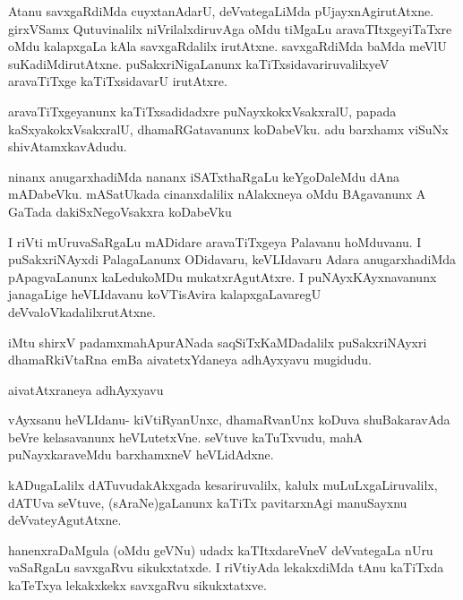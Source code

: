 \documentclass{article}
\begin{document}
\begin{mng}%
Atanu savxgaRdiMda cuyxtanAdarU, deVvategaLiMda pUjayxnAgirutAtxne. 
girxVSamx Qutuvinalilx niVrilalxdiruvAga oMdu tiMgaLu 
aravaTItxgeyiTaTxre oMdu kalapxgaLa kAla savxgaRdalilx irutAtxne. 
savxgaRdiMda baMda meVlU suKadiMdirutAtxne. puSakxriNigaLanunx 
kaTiTxsidavariruvalilxyeV aravaTiTxge kaTiTxsidavarU irutAtxre.
\end{mng}

\begin{mng}%
aravaTiTxgeyanunx kaTiTxsadidadxre puNayxkokxVsakxralU, papada 
kaSxyakokxVsakxralU, dhamaRGatavanunx koDabeVku. adu barxhamx viSuNx 
shivAtamxkavAdudu.
\end{mng}

\begin{mng}%
ninanx anugarxhadiMda nananx iSATxthaRgaLu keYgoDaleMdu dAna 
mADabeVku. mASatUkada cinanxdalilix nAlakxneya oMdu BAgavanunx A GaTada 
dakiSxNegoVsakxra  koDabeVku
\end{mng}

\begin{mng}%
I riVti mUruvaSaRgaLu mADidare aravaTiTxgeya Palavanu hoMduvanu. I 
puSakxriNAyxdi PalagaLanunx ODidavaru, keVLIdavaru Adara 
anugarxhadiMda pApagvaLanunx kaLedukoMDu mukatxrAgutAtxre. I 
puNAyxKAyxnavanunx janagaLige heVLIdavanu koVTisAvira kalapxgaLavaregU 
deVvaloVkadalilxrutAtxne.
\end{mng}

\begin{center}
iMtu shirxV padamxmahApurANada saqSiTxKaMDadalilx puSakxriNAyxri 
dhamaRkiVtaRna emBa aivatetxYdaneya adhAyxyavu mugidudu.
\end{center}

\begin{center}
{\textbf\large{aivatAtxraneya adhAyxyavu}}
\end{center}


\begin{mng}%
vAyxsanu heVLIdanu- kiVtiRyanUnxc, dhamaRvanUnx koDuva shuBakaravAda 
beVre kelasavanunx heVLutetxVne. seVtuve kaTuTxvudu, mahA 
puNayxkaraveMdu barxhamxneV heVLidAdxne.
\end{mng}

\begin{mng}%
kADugaLalilx dATuvudakAkxgada kesariruvalilx, kalulx 
muLuLxgaLiruvalilx, dATUva seVtuve, (sAraNe)gaLanunx kaTiTx 
pavitarxnAgi manuSayxnu deVvateyAgutAtxne.
\end{mng}

\begin{mng}%
hanenxraDaMgula (oMdu geVNu) udadx kaTItxdareVneV deVvategaLa nUru 
vaSaRgaLu savxgaRvu sikukxtatxde. I riVtiyAda lekakxdiMda tAnu 
kaTiTxda kaTeTxya lekakxkekx savxgaRvu sikukxtatxve.
\end{mng}
\end{document}
